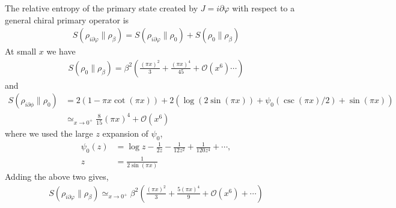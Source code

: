 \documentclass[11pt]{article}
\newcommand{\p}{\partial}
\newcommand{\mO}{\mathcal{O}}
\newcommand{\nn}{\nonumber}
\newcommand{\lb}{\left(}
\newcommand{\rb}{\right)}
\begin{document}
  The relative entropy of the primary state created by $J=i\p\varphi$ with respect to a general chiral primary operator is
  \begin{align}
  S(\rho_{i\p\varphi}\|\rho_\beta)=S(\rho_{i\p\varphi}\|\rho_0)+S(\rho_0\|\rho_\beta)
  \end{align}
At small $x$ we have
  \begin{align*}
      S(\rho_0\| \rho_\beta) = \beta^2\lb \frac{(\pi x)^2}{3} + \frac{(\pi x)^4}{45}+\mathcal{O}(x^6)\cdots\rb
  \end{align*}
  and
  \begin{align}
      S(\rho_{i\partial\phi}\|\rho_0)&=2(1-\pi x \cot(\pi x))+2\lb \log(2\sin(\pi x))+\psi_0(\csc(\pi x)/2)+\sin(\pi x)\rb\nn\\
      &\simeq_{x \to 0^+} \frac{8}{15}(\pi x)^4 +\mO(x^6) 
  \end{align}
  where we used the large $z$ expansion of $\psi_0$,
  \begin{align}
      \psi_0(z) &= \log z - \frac{1}{2z} - \frac{1}{12z^2} + \frac{1}{120z^4} + \cdots, \\ 
      z &= \frac{1}{2\sin(\pi x)}
  \end{align}
  Adding the above two gives,
  \begin{align*}
      S(\rho_{i\p \varphi}\| \rho_\beta) \simeq_{x \to 0^+} \beta^2\lb \frac{(\pi x)^2 }{3}+ \frac{5(\pi x)^4}{9}+\mathcal{O}(x^6)+\cdots\rb
  \end{align*}
  

\end{document}
